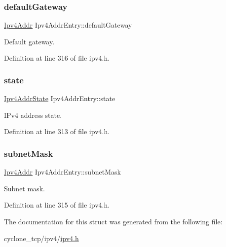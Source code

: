 \subsubsection{\texorpdfstring{default\+Gateway}{defaultGateway}}
{\footnotesize\ttfamily \hyperlink{ipv4_8h_a411debb3d770caa0c06d3f73367da37f}{Ipv4\+Addr} Ipv4\+Addr\+Entry\+::default\+Gateway}



Default gateway. 



Definition at line 316 of file ipv4.\+h.

\mbox{\label{structIpv4AddrEntry_a36c6c6703cbac5cd8fd16ffd1abd7622}} 
\subsubsection{\texorpdfstring{state}{state}}
{\footnotesize\ttfamily \hyperlink{ipv4_8h_a7bc59b5d625b1217a91f1db3917e8358}{Ipv4\+Addr\+State} Ipv4\+Addr\+Entry\+::state}



I\+Pv4 address state. 



Definition at line 313 of file ipv4.\+h.

\mbox{\label{structIpv4AddrEntry_abf3ce17e6967f88d615be5ace1b12da7}} 
\subsubsection{\texorpdfstring{subnet\+Mask}{subnetMask}}
{\footnotesize\ttfamily \hyperlink{ipv4_8h_a411debb3d770caa0c06d3f73367da37f}{Ipv4\+Addr} Ipv4\+Addr\+Entry\+::subnet\+Mask}



Subnet mask. 



Definition at line 315 of file ipv4.\+h.



The documentation for this struct was generated from the following file\+:\begin{DoxyCompactItemize}
\item 
cyclone\+\_\+tcp/ipv4/\hyperlink{ipv4_8h}{ipv4.\+h}\end{DoxyCompactItemize}
